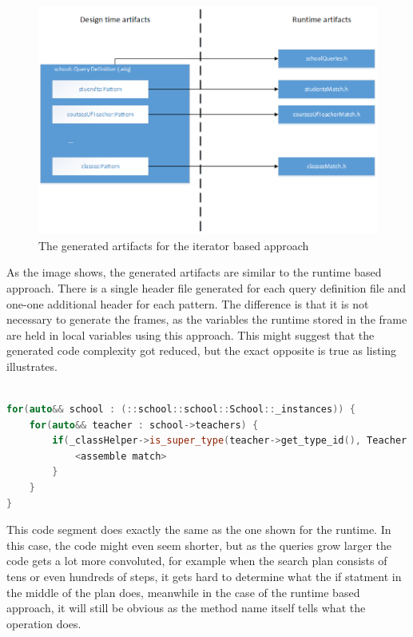 \begin{figure}[!ht]
\centering
\includegraphics[width=120mm, keepaspectratio]{figures/iterator_gen_art.png}
\caption{The generated artifacts for the iterator based approach}
\label{fig:iter_gen_art}
\end{figure}

As the image shows, the generated artifacts are similar to the runtime based
approach. There is a single header file generated for each query definition
file and one-one additional header for each pattern. The difference is that it
is not necessary to generate the frames, as the variables the runtime stored in
the frame are held in local variables using this approach. This might suggest
that the generated code complexity got reduced, but the exact opposite is true
as listing  illustrates.

\begin{lstlisting}[frame=single,float=!ht,language=C++,
label=listing:tos_gen_iter, caption=Segment of the generated code for
teachers of school]

for(auto&& school : (::school::school::School::_instances)) {
	for(auto&& teacher : school->teachers) {
		if(_classHelper->is_super_type(teacher->get_type_id(), Teacher::type_id)) { 
			<assemble match> 
		}
	}
}

\end{lstlisting}

This code segment does exactly the same as the one shown for the runtime. In
this case, the code might even seem shorter, but as the queries grow larger the
code gets a lot more convoluted, for example when the search plan consists of
tens or even hundreds of steps, it gets hard to determine what the if statment
in the middle of the plan does, meanwhile in the case of the runtime based
approach, it will still be obvious as the method name itself tells what the
operation does. 

